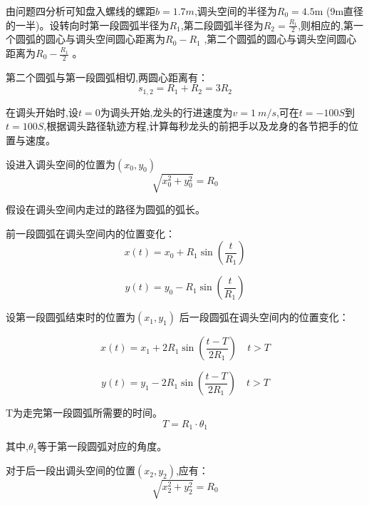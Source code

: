 
由问题四分析可知盘入螺线的螺距$b=1.7m$,调头空间的半径为$R_0=4.5$m (9m直径的一半)。设转向时第一段圆弧半径为$R_1$,第二段圆弧半径为$R_2=\frac{R_1}{2}$,则相应的,第一个圆弧的圆心与调头空间圆心距离为$R_0-R_1$ ,第二个圆弧的圆心与调头空间圆心距离为$R_0-\frac{R_1}{2}$ 。

第二个圆弧与第一段圆弧相切,两圆心距离有：
\begin{equation}
	s_{1,2}=R_{1}+R_{2}=3R_{2}
\end{equation}

在调头开始时,设$t=0$为调头开始,龙头的行进速度为$v= 1\:m/s$,可在$t=-100S$到$t=100S$,根据调头路径轨迹方程,计算每秒龙头的前把手以及龙身的各节把手的位置与速度。

设进入调头空间的位置为$(x_0,y_0)$
\begin{equation}
	\sqrt{x_0^2+y_0^2}=R_{0}
\end{equation}

假设在调头空间内走过的路径为圆弧的弧长。

前一段圆弧在调头空间内的位置变化：
\begin{equation}
	x(t)=x_0+R_1\sin(\frac{t}{R_1})
\end{equation}

\begin{equation}
y(t)=y_0-R_1\sin(\frac t{R_1})
\end{equation}

设第一段圆弧结束时的位置为$(x_1,y_1)$ 后一段圆弧在调头空间内的位置变化：

\begin{equation}
x(t)=x_{1}+2R_{1}\sin(\frac{t-T}{2R_{1}})\quad t>T
\end{equation}

\begin{equation}
y(t)=y_{1}-2R_{1}\sin(\frac{t-T}{2R_{1}})\quad t>T
\end{equation}

T为走完第一段圆弧所需要的时间。
\begin{equation}
T=R_1\cdot\theta_1
\end{equation}

其中,$\theta_1$等于第一段圆弧对应的角度。

对于后一段出调头空间的位置$(x_2,y_2)$,应有：
\begin{equation}
	\sqrt{x_2^2+y_2^2}=R_0
\end{equation}

